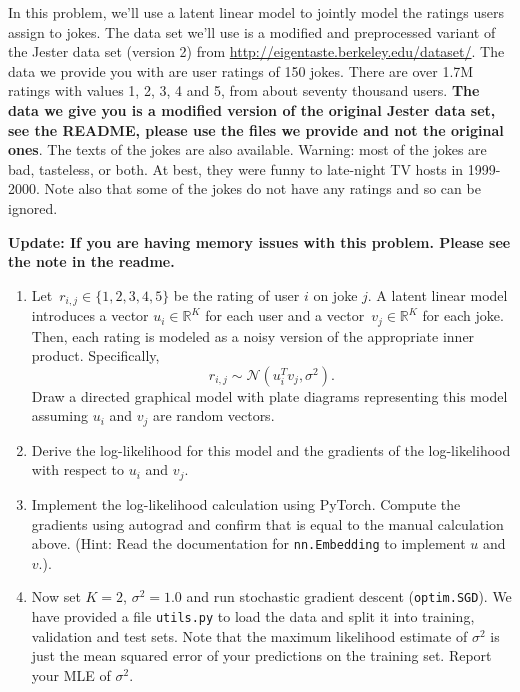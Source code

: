 \documentclass[10pt]{harvardml}
\newcommand{\R}{\mathbb{R}}
\theoremstyle{plain}
\begin{document}
\newpage
\begin{problem}
In this problem, we'll use a latent linear model to jointly model the ratings
users assign to jokes. The data set we'll use is a modified and preprocessed
variant of the Jester data set (version 2) from
\url{http://eigentaste.berkeley.edu/dataset/}. The data we provide you with are user
ratings of 150 jokes. There are over 1.7M ratings with values 1, 2, 3, 4 and 5,
from about seventy thousand users. {\bf The data we give you is a modified version of the original Jester data set, see the README,
please use the files we provide and not the original ones}. The texts of the jokes are also available.
Warning: most of the jokes are bad, tasteless, or both. At best, they were
funny to late-night TV hosts in 1999-2000. Note also that some of the jokes do
not have any ratings and so can be ignored.

\textbf{Update: If you are having memory issues with this problem. Please see the note in the
readme.}

\begin{enumerate}[label=(\alph*)]
\item
Let~${r_{i,j}\in\{1,2,3,4,5\}}$ be the rating of user $i$ on joke $j$.  A latent linear model introduces a vector ${u_i\in\R^K}$ for each user and a vector~${v_j\in\R^K}$ for each joke.  Then, each rating is modeled as a noisy version of the appropriate inner product. Specifically,
\[
r_{i,j} \sim \mathcal{N}(u_i^T v_j, \sigma^2).
\]
Draw a directed graphical model with plate diagrams representing this model assuming $u_i$ and $v_j$ are random vectors.

\item Derive the log-likelihood for this model and the gradients of the log-likelihood with respect to $u_i$ and $v_j$.

\item Implement the log-likelihood calculation using PyTorch.  Compute
  the gradients using autograd and confirm that is equal to the
  manual calculation above. (Hint: Read the documentation for \texttt{nn.Embedding}
  to implement $u$ and $v$.).

\item Now set $K = 2$, $\sigma^2=1.0$ and run stochastic gradient
    descent (\texttt{optim.SGD}). We have provided a file \texttt{utils.py} to load the
    data and split it into training, validation and test sets. Note that the maximum
  likelihood estimate of $\sigma^2$ is just the mean squared error of
  your predictions on the training set. Report your MLE of $\sigma^2$.


\end{enumerate}
\end{problem}
\end{document}
